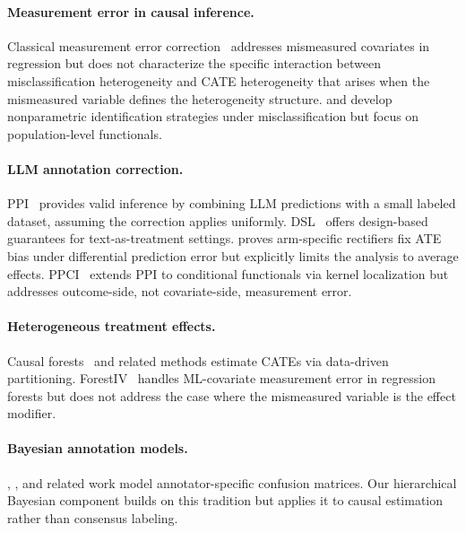 \documentclass[11pt,a4paper]{article}
\begin{document}
\paragraph{Measurement error in causal inference.} Classical measurement error correction~\citep{carroll2006measurement,gustafson2004measurement} addresses mismeasured covariates in regression but does not characterize the specific interaction between misclassification heterogeneity and CATE heterogeneity that arises when the mismeasured variable defines the heterogeneity structure. \citet{hu2008instrumental} and \citet{schennach2016recent} develop nonparametric identification strategies under misclassification but focus on population-level functionals.

\paragraph{LLM annotation correction.} PPI~\citep{angelopoulos2023prediction} provides valid inference by combining LLM predictions with a small labeled dataset, assuming the correction applies uniformly. DSL~\citep{egami2024using} offers design-based guarantees for text-as-treatment settings. \citet{mozer2026arm} proves arm-specific rectifiers fix ATE bias under differential prediction error but explicitly limits the analysis to average effects. PPCI~\citep{sui2026ppci} extends PPI to conditional functionals via kernel localization but addresses outcome-side, not covariate-side, measurement error.

\paragraph{Heterogeneous treatment effects.} Causal forests~\citep{athey2019generalized,wager2018estimation} and related methods estimate CATEs via data-driven partitioning. ForestIV~\citep{bu2023treatment} handles ML-covariate measurement error in regression forests but does not address the case where the mismeasured variable is the effect modifier.

\paragraph{Bayesian annotation models.} \citet{dawid1979maximum}, \citet{paun2018comparing}, and related work model annotator-specific confusion matrices. Our hierarchical Bayesian component builds on this tradition but applies it to causal estimation rather than consensus labeling.
\end{document}
